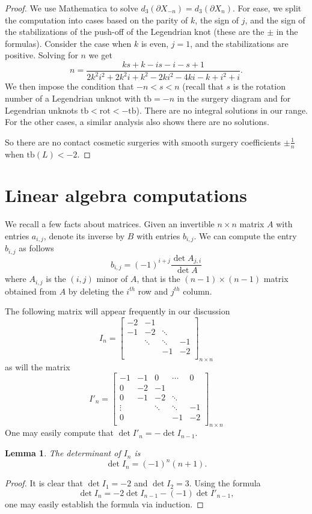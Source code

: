 \documentclass[12pt]{amsart}
\newtheorem{lemma}[theorem]{Lemma}
\theoremstyle{definition}
\theoremstyle{definition}
\newcommand{\rot}{\text{rot}}
\newcommand{\tb}{\text{tb}}
\begin{document}
\begin{proof}
			
			We use Mathematica to solve $d_3(\partial X_{-n})=d_3(\partial X_n)$. For ease, we split the computation into cases based on the parity of $k$, the sign of $j$, and the sign of the stabilizations of the push-off of the Legendrian knot (these are the $\pm$ in the formulas). Consider the case when $k$ is even, $j=1$, and the stabilizations are positive. Solving for $n$ we get 
			$$n=\frac{ks+k-i s-i-s+1}{2k^2 i^2+2 k^2 i+k^2-2ki^2-4ki-k+i^2+i}.$$ 
			We then impose the condition that $-n<s<n$ (recall that $s$ is the rotation number of a Legendrian unknot with $\tb=-n$ in the surgery diagram and for Legendrian unknots $\tb<\rot<-\tb$). There are no integral solutions in our range. For the other cases, a similar analysis also shows there are no solutions.
			
			So there are no contact cosmetic surgeries with smooth surgery coefficients $\pm \frac{1}{n}$ when $\tb(L)<-2$. 
		\end{proof}
	
		\appendix
		\section{Linear algebra computations}\label{lac}
		
		We recall a few facts about matrices. Given an invertible $n\times n$ matrix $A$ with entries $a_{i,j}$, denote its inverse by $B$ with entries $b_{i,j}$. We can compute the entry $b_{i,j}$ as follows
		\[
		b_{i,j}=(-1)^{i+j}\frac{\det A_{j,i}}{\det A}
		\]
		where $A_{i,j}$ is the $(i,j)$ minor of $A$, that is the $(n-1)\times (n-1)$ matrix obtained from $A$ by deleting the $i^{th}$ row and $j^{th}$ column. 
		
		The following matrix will appear frequently in our discussion
		\[
		I_n=
		\begin{bmatrix}
			-2 & -1 & &   \\
			-1 & -2 & \ddots&    \\
			
			& \ddots & \ddots  &-1\\
			&&-1 & -2   \\
		\end{bmatrix}_{n \times n}
		\]
		as will the matrix
		\[
		I'_n=
		\begin{bmatrix}
			-1&-1&0&\cdots &0\\
			0& -2 & -1 & &   \\
			0&-1 & -2 & \ddots&    \\
			
			\vdots&  & \ddots & \ddots  &-1\\
			0& &&-1 & -2   \\
		\end{bmatrix}_{n \times n}
		\]
		One may easily compute that $\det I'_n=-\det I_{n-1}$.
		\begin{lemma}
			The determinant of $I_n$ is 
			\[
			\det I_n= (-1)^n(n+1).
			\]
		\end{lemma}
		\begin{proof}
			It is clear that $\det I_1=-2$ and $\det I_2=3$. Using the formula
			\[
			\det I_n=-2\det I_{n-1} -(-1)\det I'_{n-1},
			\]
			one may easily establish the formula via induction. 
		\end{proof}
		
\end{document}

